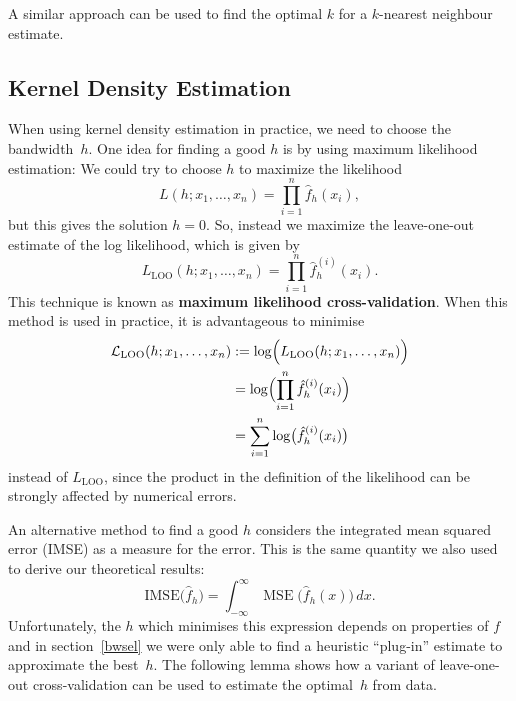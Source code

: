 \documentclass[
  a4paper,
]{article}
\theoremstyle{definition}
\theoremstyle{definition}
\theoremstyle{definition}
\theoremstyle{definition}
\theoremstyle{remark}
\begin{document}
A similar approach can be used to find the optimal \(k\) for
a \(k\)-nearest neighbour estimate.

\subsection{Kernel Density Estimation}\label{kernel-density-estimation-1}

When using kernel density estimation in practice, we need to choose the
bandwidth~\(h\). One idea for finding a good \(h\) is by using
maximum likelihood estimation: We could try to
choose \(h\) to maximize the likelihood
\begin{equation*}
  L(h;x_1, \ldots, x_n)
  = \prod_{i=1}^n \hat f_h(x_i),
\end{equation*}
but this gives the solution \(h=0\). So, instead we maximize the
leave-one-out estimate of the log likelihood, which is given by
\begin{equation*}
  L_\mathrm{LOO}(h;x_1, \ldots, x_n)
  = \prod_{i=1}^n \hat f^{(i)}_h(x_i).
\end{equation*}
This technique is known as \textbf{maximum likelihood cross-validation}.
When this method is used in practice, it is advantageous to minimise
\begin{align*}
  \mathcal{L}_\mathrm{LOO}(h;x_1, \ldots, x_n)
  &:= \log\Bigl( L_\mathrm{LOO}(h;x_1, \ldots, x_n) \Bigr) \\
  &= \log\Bigl( \prod_{i=1}^n \hat f^{(i)}_h(x_i) \Bigr) \\
  &= \sum_{i=1}^n \log\bigl( \hat f^{(i)}_h(x_i) \bigr)
\end{align*}
instead of \(L_\mathrm{LOO}\), since the product in the definition
of the likelihood can be strongly affected by numerical errors.

An alternative method to find a good \(h\) considers the
integrated mean squared error (IMSE) as a measure for the error.
This is the same quantity we also used to derive our theoretical results:
\begin{equation*}
  \mathrm{IMSE}\bigl( \hat f_h \bigr)
  = \int_{-\infty}^\infty \mathop{\mathrm{MSE}}\nolimits\bigl( \hat f_h(x) \bigr) \,dx.
\end{equation*}
Unfortunately, the \(h\) which minimises this expression depends
on properties of \(f\) and in section~\ref{bwsel} we were only
able to find a heuristic ``plug-in'' estimate to approximate the best~\(h\).
The following lemma shows how a variant of leave-one-out cross-validation
can be used to estimate the optimal~\(h\) from data.
\end{document}
